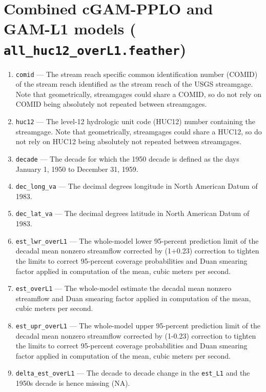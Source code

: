 \documentclass[1p, authoryear, 11pt, times, preprint]{elsarticle}
\newcommand{\code}[1]{{\color{black}%
                       \mbox{\lstinline[basicstyle={\small\ttfamily},
                                        keywordstyle=\scriptsize\ttfamily]|#1|}}}
\begin{document}
\section{Combined cGAM-PPLO and GAM-L1 models (\code{all_huc12_overL1.feather})}
\begin{enumerate}
\footnotesize
\RaggedRight
\item \code{comid} --- The stream reach specific common identification number (COMID) of the stream reach identified as the stream reach of the USGS streamgage. Note that geometrically, streamgages could share a COMID, so do not rely on COMID being absolutely not repeated between streamgages.
\item \code{huc12} --- The level-12 hydrologic unit code (HUC12) number containing the streamgage. Note that geometrically, streamgages could share a HUC12, so do not rely on HUC12 being absolutely not repeated between streamgages.
\item \code{decade} --- The decade for which the 1950 decade is defined as the days January 1, 1950 to December 31, 1959.
\item \code{dec_long_va} --- The decimal degrees longitude in North American Datum of 1983.
\item \code{dec_lat_va} --- The decimal degrees latitude in North American Datum of 1983.
\item \code{est_lwr_overL1} --- The whole-model lower 95-percent prediction limit of the decadal mean nonzero streamflow corrected by (1+0.23) correction to tighten the limits to correct 95-percent coverage probabilities and Duan smearing factor applied in computation of the mean, cubic meters per second.
\item \code{est_overL1} --- The whole-model estimate the decadal mean nonzero streamflow and Duan smearing factor applied in computation of the mean, cubic meters per second.
\item \code{est_upr_overL1} --- The whole-model upper 95-percent prediction limit of the decadal mean nonzero streamflow corrected by (1-0.23) correction to tighten the limits to correct 95-percent coverage probabilities and Duan smearing factor applied in computation of the mean, cubic meters per second.
\item \code{delta_est_overL1} --- The decade to decade change in the \code{est_L1} and the 1950s decade is hence missing (NA).
\end{enumerate}
\end{document}
